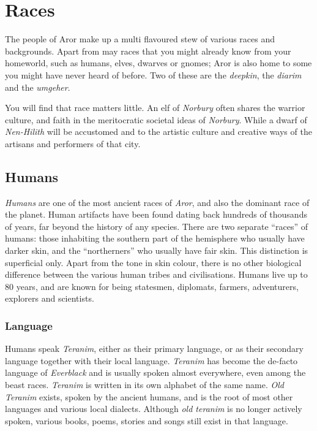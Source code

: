 \twocolumn
\section*{Races}

The people of Aror make up a multi flavoured stew of various races and
backgrounds. Apart from may races that you might already know from your
homeworld, such as humans, elves, dwarves or gnomes; Aror is also home to some
you might have never heard of before. Two of these are the \emph{deepkin}, the
\emph{diarim} and the \emph{umgeher}.

You will find that race matters little. An elf of \emph{Norbury} often shares
the warrior culture, and faith in the meritocratic societal ideas
of \emph{Norbury}. While a dwarf of \emph{Nen-Hilith} will be accustomed and
to the artistic culture and creative ways of the artisans and performers of
that city.

\subsection*{Humans}

\emph{Humans} are one of the most ancient races of \emph{Aror}, and also the
dominant race of the planet. Human artifacts have been found dating back
hundreds of thousands of years, far beyond the history of any species. There
are two separate ``races'' of humans: those inhabiting the southern part of
the hemisphere who usually have darker skin, and the ``northerners'' who
usually have fair skin. This distinction is superficial only. Apart from the
tone in skin colour, there is no other biological difference between the
various human tribes and civilisations. Humans live up to 80 years, and are
known for being statesmen, diplomats, farmers, adventurers, explorers and
scientists.

\subsubsection*{Language}

Humans speak \emph{Teranim}, either as their primary language, or as their
secondary language together with their local language. \emph{Teranim} has
become the de-facto language of \emph{Everblack} and is usually spoken almost
everywhere, even among the beast races. \emph{Teranim} is written in its own
alphabet of the same name. \emph{Old Teranim} exists, spoken by the ancient
humans, and is the root of most other languages and various local dialects.
Although \emph{old teranim} is no longer actively spoken, various books,
poems, stories and songs still exist in that language.

